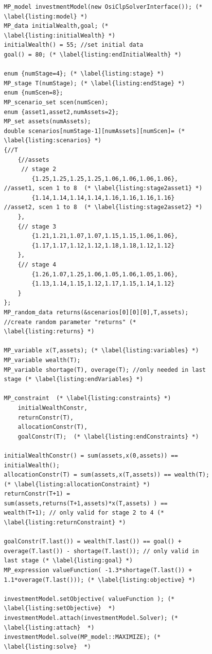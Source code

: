 \documentclass[a4paper,10pt,pdftex]{scrartcl}
\begin{document}
\begin{figure}[htbp]
\begin{lstlisting}[caption={Investment Example in FlopC++},label={list:investment}]
MP_model investmentModel(new OsiClpSolverInterface()); (* \label{listing:model} *)
MP_data initialWealth,goal; (* \label{listing:initialWealth} *)
initialWealth() = 55; //set initial data
goal() = 80; (* \label{listing:endInitialWealth} *)

enum {numStage=4}; (* \label{listing:stage} *)
MP_stage T(numStage); (* \label{listing:endStage} *)
enum {numScen=8};
MP_scenario_set scen(numScen); 
enum {asset1,asset2,numAssets=2};
MP_set assets(numAssets); 
double scenarios[numStage-1][numAssets][numScen]= (* \label{listing:scenarios} *)
{//T
    {//assets
     // stage 2
        {1.25,1.25,1.25,1.25,1.06,1.06,1.06,1.06}, //asset1, scen 1 to 8  (* \label{listing:stage2asset1} *)
        {1.14,1.14,1.14,1.14,1.16,1.16,1.16,1.16}  //asset2, scen 1 to 8  (* \label{listing:stage2asset2} *)
    },
    {// stage 3
        {1.21,1.21,1.07,1.07,1.15,1.15,1.06,1.06},
        {1.17,1.17,1.12,1.12,1.18,1.18,1.12,1.12} 
    },
    {// stage 4
        {1.26,1.07,1.25,1.06,1.05,1.06,1.05,1.06},
        {1.13,1.14,1.15,1.12,1.17,1.15,1.14,1.12} 
    }
};
MP_random_data returns(&scenarios[0][0][0],T,assets); //create random parameter "returns" (* \label{listing:returns} *)

MP_variable x(T,assets); (* \label{listing:variables} *)
MP_variable wealth(T);
MP_variable shortage(T), overage(T); //only needed in last stage (* \label{listing:endVariables} *)

MP_constraint  (* \label{listing:constraints} *)
    initialWealthConstr,
    returnConstr(T),
    allocationConstr(T),
    goalConstr(T);  (* \label{listing:endConstraints} *)

initialWealthConstr() = sum(assets,x(0,assets)) == initialWealth(); 
allocationConstr(T) = sum(assets,x(T,assets)) == wealth(T); (* \label{listing:allocationConstraint} *)
returnConstr(T+1) = sum(assets,returns(T+1,assets)*x(T,assets) ) == wealth(T+1); // only valid for stage 2 to 4 (* \label{listing:returnConstraint} *)

goalConstr(T.last()) = wealth(T.last()) == goal() + overage(T.last()) - shortage(T.last()); // only valid in last stage (* \label{listing:goal} *)
MP_expression valueFunction( -1.3*shortage(T.last()) + 1.1*overage(T.last())); (* \label{listing:objective} *)

investmentModel.setObjective( valueFunction ); (* \label{listing:setObjective}  *)
investmentModel.attach(investmentModel.Solver); (* \label{listing:attach}  *)
investmentModel.solve(MP_model::MAXIMIZE); (* \label{listing:solve}  *)
\end{lstlisting}
\end{figure}
\end{document}
